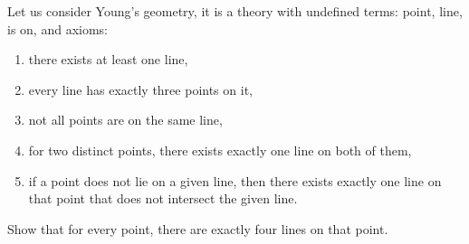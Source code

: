 \begin{chapterendexercises}
    \exercise Let us consider Young's geometry, it is a theory with undefined
        terms: point, line, is on, and axioms:
        \begin{enumerate}
            \item there exists at least one line,
            \item every line has exactly three points on it,
            \item not all points are on the same line,
            \item for two distinct points, there exists exactly one line on both of
              them,
            \item if a point does not lie on a given line, then there exists exactly
              one line on that point that does not intersect the given line.
        \end{enumerate}

        Show that for every point, there are exactly four lines on that point.

\end{chapterendexercises}
